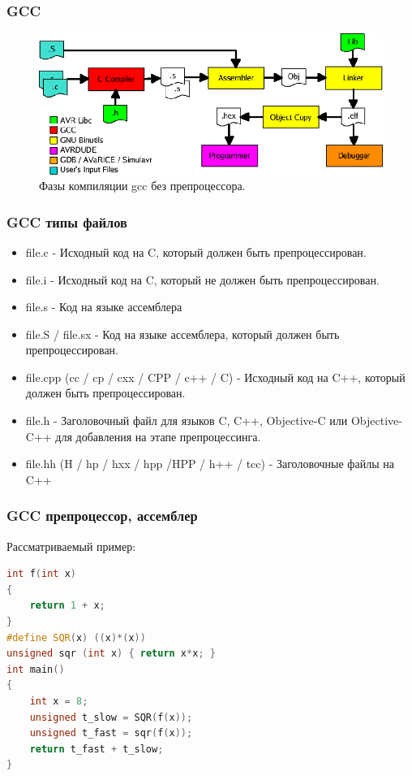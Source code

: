 \documentclass[10pt,fullscreen=true, bookmarks=false]{beamer}
\begin{document}
\begin{frame}[fragile]
\frametitle{GCC}

\begin{figure}
  \includegraphics[width=\linewidth]{avrgcc-compilerchain.png}
  \caption{Фазы компиляции gcc без препроцессора.}
\end{figure}

\tableofcontents[pausesections]
\end{frame}

\begin{frame}[fragile]
\frametitle{GCC типы файлов}
\begin{itemize}
\item file.c  - Исходный код на C, который должен быть препроцессирован.
    \item file.i  - Исходный код на C, который не должен быть препроцессирован.
    \item file.s  - Код на языке ассемблера
    \item file.S / file.sx  - Код на языке ассемблера, который должен быть препроцессирован.
    \item file.cpp (cc / cp / cxx / CPP / c++ / C)   -  Исходный код на C++, который должен быть препроцессирован.
    \item file.h - Заголовочный файл для языков C, C++, Objective-C или Objective-C++ для добавления на этапе препроцессинга.
    \item file.hh (H / hp / hxx / hpp /HPP / h++ / tcc) - Заголовочные файлы на C++
\end{itemize}

\tableofcontents[pausesections]
\end{frame}


\begin{frame}[fragile]
\frametitle{GCC препроцессор, ассемблер}

Рассматриваемый пример:

\begin{lstlisting}[language=C++]
int f(int x)
{
	return 1 + x;
}
#define SQR(x) ((x)*(x))
unsigned sqr (int x) { return x*x; }
int main()
{
	int x = 8;
	unsigned t_slow = SQR(f(x));
	unsigned t_fast = sqr(f(x));
	return t_fast + t_slow;
}
\end{lstlisting}
\tableofcontents[pausesections]
\end{frame}
\end{document}
